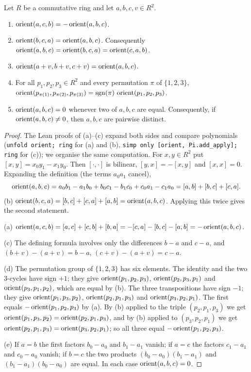 \begin{lemma}\label{fd:lem:orient}\sloppy
Let $R$ be a commutative ring and let $a,b,c,v\in R^2$.
\begin{enumerate}[label=(\alph*)]
\item $\operatorname{orient}(a,c,b)=-\operatorname{orient}(a,b,c)$.
\item $\operatorname{orient}(b,c,a)=\operatorname{orient}(a,b,c)$. Consequently $\operatorname{orient}(a,b,c)=\operatorname{orient}(b,c,a)=\operatorname{orient}(c,a,b)$.
\item $\operatorname{orient}(a+v,b+v,c+v)=\operatorname{orient}(a,b,c)$.
\item For all $p_1,p_2,p_3\in R^2$ and every permutation $\pi$ of $\{1,2,3\}$,
  $\operatorname{orient}(p_{\pi(1)},p_{\pi(2)},p_{\pi(3)})=\operatorname{sgn}(\pi)\,\operatorname{orient}(p_1,p_2,p_3)$.
\item $\operatorname{orient}(a,b,c)=0$ whenever two of $a,b,c$ are equal. Consequently, if $\operatorname{orient}(a,b,c)\ne0$, then
  $a,b,c$ are pairwise distinct.
\end{enumerate}
\end{lemma}

\begin{proof}
The Lean proofs of (a)--(c) expand both sides and compare polynomials (\texttt{unfold orient; ring} for
(a) and (b), \texttt{simp only [orient, Pi.add\_apply]; ring} for (c)); we organise the same
computation. For $x,y\in R^2$ put $[x,y]=x_0y_1-x_1y_0$. Then $[\cdot,\cdot]$ is
bilinear, $[y,x]=-[x,y]$ and $[x,x]=0$. Expanding the definition (the terms $a_0a_1$ cancel),
\[
  \operatorname{orient}(a,b,c)=a_0b_1-a_1b_0+b_0c_1-b_1c_0+c_0a_1-c_1a_0=[a,b]+[b,c]+[c,a].
\]
(b) $\operatorname{orient}(b,c,a)=[b,c]+[c,a]+[a,b]=\operatorname{orient}(a,b,c)$. Applying this twice gives the second statement.

(a) $\operatorname{orient}(a,c,b)=[a,c]+[c,b]+[b,a]=-[c,a]-[b,c]-[a,b]=-\operatorname{orient}(a,b,c)$.

(c) The defining formula involves only the differences $b-a$ and $c-a$, and
$(b+v)-(a+v)=b-a$, $(c+v)-(a+v)=c-a$.

(d) The permutation group of $\{1,2,3\}$ has six elements. The identity and the two $3$-cycles have sign
$+1$; they give $\operatorname{orient}(p_1,p_2,p_3)$, $\operatorname{orient}(p_2,p_3,p_1)$ and $\operatorname{orient}(p_3,p_1,p_2)$, which are equal
by (b). The three transpositions have sign $-1$; they give $\operatorname{orient}(p_1,p_3,p_2)$, $\operatorname{orient}(p_2,p_1,p_3)$
and $\operatorname{orient}(p_3,p_2,p_1)$. The first equals $-\operatorname{orient}(p_1,p_2,p_3)$ by (a). By (b) applied to the triple
$(p_2,p_1,p_3)$ we get $\operatorname{orient}(p_1,p_3,p_2)=\operatorname{orient}(p_2,p_1,p_3)$, and by (b) applied to
$(p_3,p_2,p_1)$ we get $\operatorname{orient}(p_2,p_1,p_3)=\operatorname{orient}(p_3,p_2,p_1)$; so all three equal
$-\operatorname{orient}(p_1,p_2,p_3)$.

(e) If $a=b$ the first factors $b_0-a_0$ and $b_1-a_1$ vanish; if $a=c$ the factors $c_1-a_1$ and
$c_0-a_0$ vanish; if $b=c$ the two products $(b_0-a_0)(b_1-a_1)$ and $(b_1-a_1)(b_0-a_0)$ are equal. In
each case $\operatorname{orient}(a,b,c)=0$.
\end{proof}

